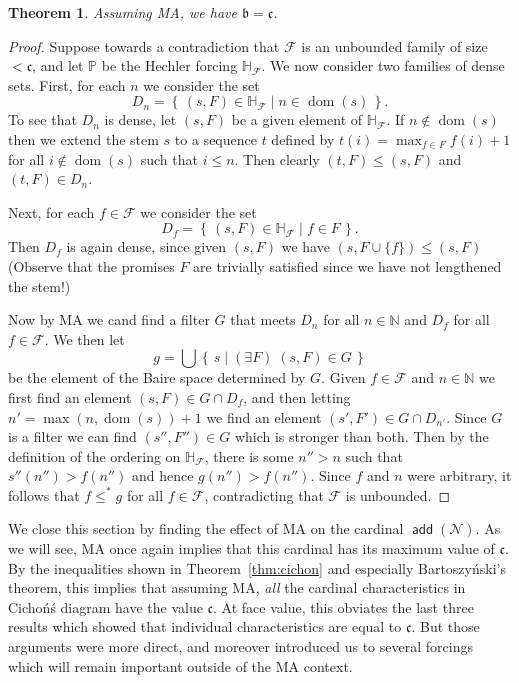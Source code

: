 \documentclass[11pt,oneside]{amsbook}
\newcommand{\set}[1]{\left\{\,#1\,\right\}}
\newcommand{\NN}{\mathbb N}
\newcommand{\PP}{\mathbb P}
\newcommand{\Null}{\mathcal N}
\DeclareMathOperator{\add}{\mathsf{add}}
\DeclareMathOperator{\dom}{dom}
\theoremstyle{definition}
\theoremstyle{plain}
\newtheorem{thm}{Theorem}[section]
\theoremstyle{definition}
\theoremstyle{remark}
\begin{document}
\begin{thm}
  Assuming MA, we have $\mathfrak b=\mathfrak c$.
\end{thm}

\begin{proof}
  Suppose towards a contradiction that $\mathcal F$ is an unbounded family of size $<\mathfrak c$, and let $\PP$ be the Hechler forcing $\mathbb H_{\mathcal F}$. We now consider two families of dense sets. First, for each $n$ we consider the set
  \[D_n=\set{(s,F)\in\mathbb H_{\mathcal F}\mid n\in\dom(s)}\text{.}
  \]
  To see that $D_n$ is dense, let $(s,F)$ be a given element of $\mathbb H_{\mathcal F}$. If $n\notin\dom(s)$ then we extend the stem $s$ to a sequence $t$ defined by $t(i)=\max_{f\in F}f(i)+1$ for all $i\notin\dom(s)$ such that $i\leq n$. Then clearly $(t,F)\leq(s,F)$ and $(t,F)\in D_n$.

  Next, for each $f\in\mathcal F$ we consider the set
  \[D_f=\set{(s,F)\in\mathbb H_{\mathcal F}\mid f\in F}\text{.}
  \]
  Then $D_f$ is again dense, since given $(s,F)$ we have $(s,F\cup\{f\})\leq(s,F)$ (Observe that the promises $F$ are trivially satisfied since we have not lengthened the stem!)

  Now by MA we cand find a filter $G$ that meets $D_n$ for all $n\in\NN$ and  $D_f$ for all $f\in\mathcal F$. We then let
  \[g=\bigcup\set{s\mid(\exists F)\;(s,F)\in G}
  \]
  be the element of the Baire space determined by $G$. Given $f\in\mathcal F$ and $n\in\NN$ we first find an element $(s,F)\in G\cap D_f$, and then letting $n'=\max(n,\dom(s))+1$ we find an element $(s',F')\in G\cap D_{n'}$. Since $G$ is a filter we can find $(s'',F'')\in G$ which is stronger than both. Then by the definition of the ordering on $\mathbb H_{\mathcal F}$, there is some $n''>n$ such that $s''(n'')>f(n'')$ and hence $g(n'')>f(n'')$. Since $f$ and $n$ were arbitrary, it follows that $f\leq^*g$ for all $f\in\mathcal F$, contradicting that $\mathcal F$ is unbounded.
\end{proof}

We close this section by finding the effect of MA on the cardinal $\add(\Null)$. As we will see, MA once again implies that this cardinal has its maximum value of $\mathfrak c$. By the inequalities shown in Theorem~\ref{thm:cichon} and especially Bartoszy\'nski's theorem, this implies that assuming MA, \emph{all} the cardinal characteristics in Cicho\'n\'s diagram have the value $\mathfrak c$. At face value, this obviates the last three results which showed that individual characteristics are equal to $\mathfrak c$. But those arguments were more direct, and moreover introduced us to several forcings which will remain important outside of the MA context.
\end{document}
